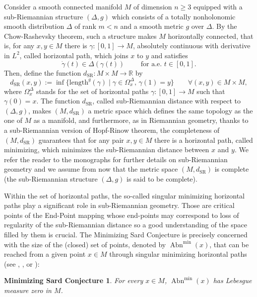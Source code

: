 \documentclass[JEP,XML,SOM,Unicode,NoFloatCountersInSection,published]{cedram}
\let\sep\mid
\newcommand{\SR}{{\scriptscriptstyle\mathrm{SR}}}
\DeclareMathOperator{\Abn}{Abn}
\newcommand\R{\mathbb R}
\newtheorem*{MSC*}{Minimizing Sard Conjecture}
\theoremstyle{definition}
\begin{document}
Consider a smooth connected manifold $M$ of dimension $n\geq 3$ equipped with a sub-Riemannian structure $(\Delta,g)$ which consists of a totally nonholonomic smooth distribution $\Delta$ of rank $m<n$ and a smooth metric $g$ over $\Delta$. By the Chow-Rashevsky theorem, such a structure makes $M$ horizontally connected, that is, for any $x,y \in M$ there is $\gamma:[0,1] \to M$, absolutely continuous with derivative in $L^2$, called horizontal path, which joins $x$ to $y$ and satisfies
\[
\dot{\gamma}(t) \in \Delta \left(\gamma(t)\right) \qquad \text{ for a.e. } t \in [0,1].
\]
Then, define the function $d_{\SR}:M\times M \to \R$ by
\[
d_{\SR}(x,y) := \inf \bigl\{ \mathrm{length}^g(\gamma) \sep  \gamma \in \Omega^{\Delta}_x, \, \gamma(1) = y\bigr\} \qquad \forall (x,y) \in M \times M,
\]
where $\Omega^{\Delta}_x$ stands for the set of horizontal paths $\gamma:[0,1] \to M$ such that $\gamma(0)=x$. The function $d_{\SR}$, called sub-Riemannian distance with respect to $(\Delta,g)$, makes $(M,d_{\SR})$ a metric space which defines the same topology as the one of $M$ as a manifold, and furthermore, as in Riemannian geometry, thanks to a sub-Riemannian version of Hopf-Rinow theorem, the completeness of $(M,d_{\SR})$ guarantees that for any pair $x,y\in M$ there is a horizontal path, called minimizing, which minimizes the sub-Riemannian distance between $x$ and $y$. We refer the reader to the monographs \cite{abb17,montgomery02,riffordbook} for further details on sub-Riemannian geometry and we assume from now that the metric space $(M,d_{\SR})$ is complete (the sub-Riemannian structure $(\Delta,g)$ is said to be complete).

Within the set of horizontal paths, the so-called singular minimizing horizontal paths play a significant role in sub-Riemannian geometry. Those are critical points of the End-Point mapping whose end-points may correspond to loss of regularity of the sub-Riemannian distance so a good understanding of the space filled by them is crucial. The Minimizing Sard Conjecture is precisely concerned with the size of the (closed) set of points, denoted by $\Abn^{\min}(x)$, that can be reached from a given point $x\in M$ through singular minimizing horizontal paths (see \cite[\S 10.2]{montgomery02}, \cite[Conj.\,1, p.\,158]{rt05}, \cite[\S III.]{agrachev14} or \cite[\S 2.1]{br20}):

\begin{MSC*}
For every $x\in M$, $\Abn^{\min}(x)$ has Lebesgue measure zero in $M$.
\end{MSC*}
\end{document}
